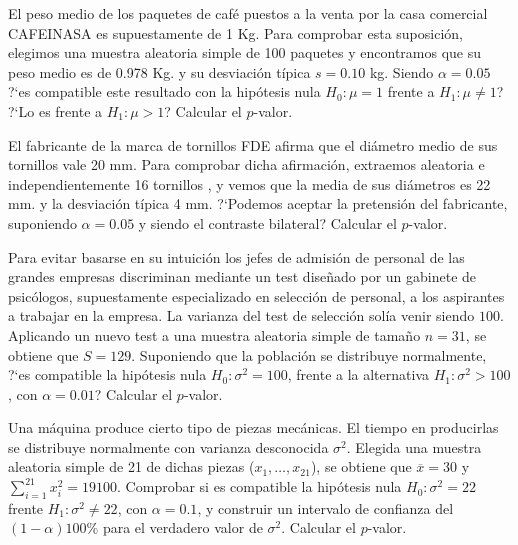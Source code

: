 \documentclass[12pt]{article}
\begin{document}
\begin{prob}%
El peso medio de los paquetes de café puestos a la venta por la casa comercial CAFEINASA es
supuestamente de 1 Kg. Para comprobar esta suposición, elegimos una muestra aleatoria
simple de 100 paquetes y encontramos que su peso  medio es de 0.978 Kg. y su desviación
típica $s=0.10$ kg. Siendo $\alpha=0.05$ ?`es compatible este resultado con la hipótesis
nula $H_{0}:\mu=1$ frente a $H_{1}:\mu\not=1$? ?`Lo es frente a $H_{1}:\mu>1$? Calcular el $p$-valor.
\end{prob}

\begin{prob}
El fabricante de la marca de tornillos FDE afirma que el diámetro medio de sus tornillos
vale 20 mm. Para comprobar dicha afirmación, extraemos aleatoria e independientemente 16
tornillos , y vemos que la media de sus diámetros  es 22 mm. y la desviación típica 4 mm.
?`Podemos aceptar la pretensión del fabricante, suponiendo $\alpha=0.05$ y siendo el
contraste bilateral? Calcular el $p$-valor.
\end{prob}

\begin{prob}
    Para evitar basarse en su intuición los jefes de admisión de
    personal de las grandes empresas discriminan mediante un test
    diseñado por un gabinete de psicólogos, supuestamente especializado
    en selección de personal, a los aspirantes a trabajar en la empresa.
    La varianza del test de selección solía venir siendo $100$.
    Aplicando un nuevo test a una muestra aleatoria simple de tamaño
    $n=31$, se obtiene que $S=129$. Suponiendo que la población se
    distribuye normalmente, ?`es compatible la hipótesis nula
    $H_{0}:\sigma^2=100$, frente a la alternativa $H_{1}:\sigma^2>100$,
    con $\alpha=0.01$? Calcular el $p$-valor.
\end{prob}

\begin{prob}
    Una máquina produce cierto tipo de piezas mecánicas. El tiempo en
    producirlas se distribuye normalmente con varianza desconocida
    $\sigma^2$. Elegida una muestra aleatoria simple de 21 de dichas
    piezas ($x_{1},\ldots,x_{21}$), se obtiene que $\overline{x}=30$ y
    $\sum_{i=1}^{21}x_{i}^2=19100.$ Comprobar si es compatible la
    hipótesis nula $H_{0}:\sigma^2=22$ frente $H_{1}:\sigma^2\not=22$,
    con $\alpha=0.1$, y construir un intervalo de confianza del
    $(1-\alpha)100\%$ para el verdadero valor de $\sigma^2$. Calcular el $p$-valor.
\end{prob}
\end{document}
